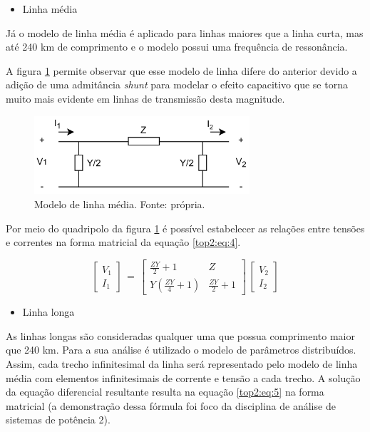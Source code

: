 \begin{itemize}
    \item Linha média
\end{itemize}

Já o modelo de linha média é aplicado para linhas maiores que a linha curta, mas até 240 km de comprimento e o modelo possui uma frequência de ressonância. 

A figura \ref{top2:fig:3} permite observar que esse modelo de linha difere do anterior devido a adição de uma admitância \textit{shunt} para modelar o efeito capacitivo que se torna muito mais evidente em linhas de transmissão desta magnitude.

\begin{figure}[H]
\begin{center}
\includegraphics[width=8cm]{images/linha_media.jpg}
\caption{Modelo de linha média. Fonte: própria.}
\label{top2:fig:3} 
\end{center}
\end{figure}

Por meio do quadripolo da figura \ref{top2:fig:3} é possível estabelecer as relações entre tensões e correntes na forma matricial da equação \ref{top2:eq:4}. 

\begin{equation} \label{top2:eq:4}
    \begin{bmatrix} V_1 \\ I_1  \end{bmatrix} \,=\, \begin{bmatrix} \frac{ZY}{2}+1 & Z \\ Y\left(\frac{ZY}{4}+1\right)  & \frac{ZY}{2}+1  \end{bmatrix}\, \begin{bmatrix} V_2 \\ I_2  \end{bmatrix}
\end{equation}


\begin{itemize}
    \item Linha longa
\end{itemize}

As linhas longas são consideradas qualquer uma que possua comprimento maior que 240 km. Para a sua análise é utilizado o modelo de parâmetros distribuídos. Assim, cada trecho infinitesimal da linha será representado pelo modelo de linha média com elementos infinitesimais de corrente e tensão a cada trecho. A solução da equação diferencial resultante resulta na equação \ref{top2:eq:5} na forma matricial (a demonstração dessa fórmula foi foco da disciplina de análise de sistemas de potência 2).  

